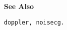 {\bf \large \sf See Also}\\
\hspace*{1.5cm}
\begin{minipage}[t]{13.5cm}
\begin{verbatim}
doppler, noisecg.
\end{verbatim}
\end{minipage}
